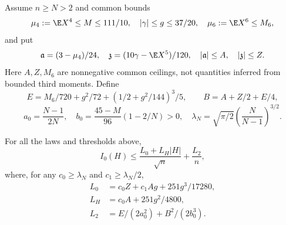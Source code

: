 Assume $n\ge N>2$ and common bounds
\[
 \mu_4:=\E X^4\le M\le111/10,\quad |\gamma|\le g\le37/20,
 \quad\mu_6:=\E X^6\le M_6,
\]
and put
\[
 \mathfrak a=(3-\mu_4)/24,\quad \mathfrak z=(10\gamma-\E X^5)/120,
 \quad |\mathfrak a|\le A,\quad |\mathfrak z|\le Z.
\]
Here $A,Z,M_6$ are nonnegative common ceilings, not quantities inferred
from bounded third moments. Define
\[
 E=M_6/720+g^2/72+(1/2+g^2/144)^3/5,\qquad
 B=A+Z/2+E/4,
\]
\[
 a_0=\frac{N-1}{2N},\quad b_0=\frac{45-M}{96}(1-2/N)>0,
 \quad\lambda_N=\sqrt{\pi/2}\left(\frac N{N-1}\right)^{3/2}.
\]
\begin{proposition}\label{j:fourier:low}
For all the laws and thresholds above,
\[
 I_0(H)\le\frac{L_0+L_H|H|}{\sqrt n}+\frac{L_2}{n},
\]
where, for any $c_0\ge\lambda_N$ and $c_1\ge\lambda_N/2$,
\begin{align*}
 L_0&=c_0Z+c_1Ag+251g^3/17280,\\
 L_H&=c_0A+251g^2/4800,\\
 L_2&=E/(2a_0^2)+B^2/(2b_0^3).
\end{align*}
\end{proposition}
